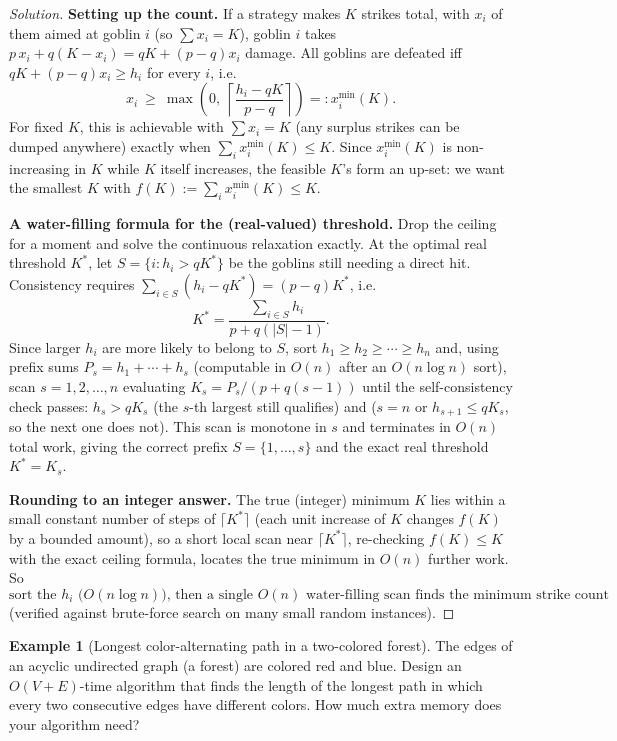 \documentclass[11pt]{article}
\theoremstyle{definition}
\newtheorem{example}{Example}[section]
\begin{document}
\begin{proof}[Solution]
\textbf{Setting up the count.} If a strategy makes $K$ strikes total, with $x_i$ of them aimed at goblin $i$ (so $\sum x_i=K$), goblin $i$ takes $p\,x_i+q(K-x_i)=qK+(p-q)x_i$ damage. All goblins are defeated iff $qK+(p-q)x_i\ge h_i$ for every $i$, i.e.\
\[
x_i\ \ge\ \max\!\left(0,\ \left\lceil\frac{h_i-qK}{p-q}\right\rceil\right)=:x_i^{\min}(K).
\]
For fixed $K$, this is achievable with $\sum x_i=K$ (any surplus strikes can be dumped anywhere) exactly when $\sum_i x_i^{\min}(K)\le K$. Since $x_i^{\min}(K)$ is non-increasing in $K$ while $K$ itself increases, the feasible $K$'s form an up-set: we want the smallest $K$ with $f(K):=\sum_i x_i^{\min}(K)\le K$.

\textbf{A water-filling formula for the (real-valued) threshold.} Drop the ceiling for a moment and solve the continuous relaxation exactly. At the optimal real threshold $K^*$, let $S=\{i:h_i>qK^*\}$ be the goblins still needing a direct hit. Consistency requires $\sum_{i\in S}(h_i-qK^*)=(p-q)K^*$, i.e.\
\[
K^*=\frac{\sum_{i\in S}h_i}{p+q(|S|-1)}.
\]
Since larger $h_i$ are more likely to belong to $S$, sort $h_1\ge h_2\ge\cdots\ge h_n$ and, using prefix sums $P_s=h_1+\cdots+h_s$ (computable in $O(n)$ after an $O(n\log n)$ sort), scan $s=1,2,\dots,n$ evaluating $K_s=P_s/(p+q(s-1))$ until the self-consistency check passes: $h_s>qK_s$ (the $s$-th largest still qualifies) and ($s=n$ or $h_{s+1}\le qK_s$, so the next one does not). This scan is monotone in $s$ and terminates in $O(n)$ total work, giving the correct prefix $S=\{1,\dots,s\}$ and the exact real threshold $K^*=K_s$.

\textbf{Rounding to an integer answer.} The true (integer) minimum $K$ lies within a small constant number of steps of $\lceil K^*\rceil$ (each unit increase of $K$ changes $f(K)$ by a bounded amount), so a short local scan near $\lceil K^*\rceil$, re-checking $f(K)\le K$ with the exact ceiling formula, locates the true minimum in $O(n)$ further work. So
\[
\boxed{\text{sort the }h_i\text{ (}O(n\log n)\text{), then a single }O(n)\text{ water-filling scan finds the minimum strike count}}
\]
(verified against brute-force search on many small random instances).
\end{proof}

\begin{example}[Longest color-alternating path in a two-colored forest]
The edges of an acyclic undirected graph (a forest) are colored red and blue. Design an $O(V+E)$-time algorithm that finds the length of the longest path in which every two consecutive edges have different colors. How much extra memory does your algorithm need?
\end{example}
\end{document}
